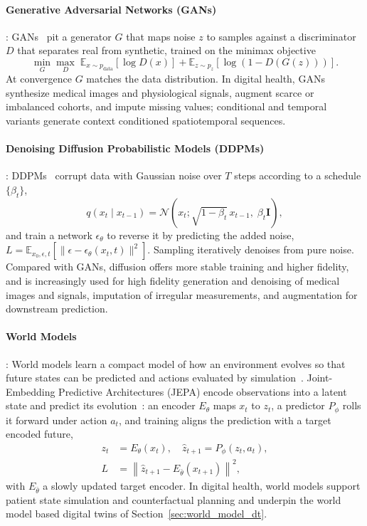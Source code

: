 \documentclass[journal]{IEEEtran}
\begin{document}
\paragraph{Generative Adversarial Networks (GANs)}: GANs~\cite{goodfellow2014gan} pit a generator $G$ that maps noise $z$ to samples against a discriminator $D$ that separates real from synthetic, trained on the minimax objective
\begin{equation}
\min_G \max_D \; \mathbb{E}_{x \sim p_{\text{data}}}[\log D(x)] + \mathbb{E}_{z \sim p_z}[\log (1 - D(G(z)))].
\end{equation}
At convergence $G$ matches the data distribution. In digital health, GANs synthesize medical images and physiological signals, augment scarce or imbalanced cohorts, and impute missing values; conditional and temporal variants generate context conditioned spatiotemporal sequences.

\paragraph{Denoising Diffusion Probabilistic Models (DDPMs)}: DDPMs~\cite{ho2020ddpm} corrupt data with Gaussian noise over $T$ steps according to a schedule $\{\beta_t\}$,
\begin{equation}
q(x_t \mid x_{t-1}) = \mathcal{N}\!\left(x_t; \sqrt{1-\beta_t}\, x_{t-1}, \; \beta_t \mathbf{I}\right),
\end{equation}
and train a network $\epsilon_\theta$ to reverse it by predicting the added noise, $L = \mathbb{E}_{x_0,\epsilon,t}[\|\epsilon - \epsilon_\theta(x_t,t)\|^2]$. Sampling iteratively denoises from pure noise. Compared with GANs, diffusion offers more stable training and higher fidelity, and is increasingly used for high fidelity generation and denoising of medical images and signals, imputation of irregular measurements, and augmentation for downstream prediction.

\paragraph{World Models}: World models learn a compact model of how an environment evolves so that future states can be predicted and actions evaluated by simulation~\cite{ha2018worldmodels}. Joint-Embedding Predictive Architectures (JEPA) encode observations into a latent state and predict its evolution~\cite{lecun2022jepa,maes2026leworldmodel}: an encoder $E_\theta$ maps $x_t$ to $z_t$, a predictor $P_\phi$ rolls it forward under action $a_t$, and training aligns the prediction with a target encoded future,
\begin{equation}
\begin{aligned}
z_t &= E_\theta(x_t), \quad \hat{z}_{t+1} = P_\phi(z_t, a_t),\\
L &= \left\| \hat{z}_{t+1} - E_{\bar{\theta}}(x_{t+1}) \right\|^2,
\end{aligned}
\end{equation}
with $E_{\bar{\theta}}$ a slowly updated target encoder. In digital health, world models support patient state simulation and counterfactual planning and underpin the world model based digital twins of Section~\ref{sec:world_model_dt}.
\end{document}
